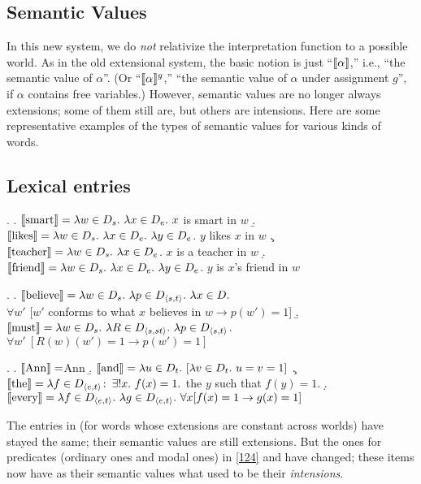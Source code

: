 \subsection{Semantic Values}

In this new system, we do \emph{not} relativize the interpretation function to a possible world. As in the old extensional system, the basic notion is just ``$\llbracket \alpha \rrbracket$,'' i.e., ``the semantic value of $\alpha$''. (Or ``$\llbracket \alpha \rrbracket^g$,'' ``the semantic value of $\alpha$ under assignment $g$'', if $\alpha$ contains free variables.) However, semantic values are no longer always extensions; some of them still are, but others are intensions. Here are some representative examples of the types of semantic values for various kinds of words.

\subsection{Lexical entries}

\ex.\label{124} \a. $\llbracket \mbox{smart} \rrbracket = \lambda w\in D_{s}.\ \lambda x\in D_{e}.\ x$ is smart in $w$ 
\b. $\sv{\mbox{likes}} = \lambda w\in D_{s}.\ \lambda x\in D_{e}.\ \lambda y\in D_{e}$. $y$ likes $x$ in $w$ 
\c. $\sv{\mbox{teacher}} = \lambda w\in D_{s}.\ \lambda x\in D_{e}$. $x$ is a teacher in $w$ 
\d. $\sv{\mbox{friend}} = \lambda w\in D_{s}.\ \lambda x\in D_{e}.\ \lambda y\in D_{e}$. $y$ is $x$'s friend in $w$

\ex. \a. $\llbracket \mbox{believe} \rrbracket = \lambda w\in D_{s}.\ \lambda p\in D_{\langle s,t \rangle}.\ \lambda x\in D.$ \\
\null\hfill$\forall w'$ [$w'$ conforms to what $x$ believes in $w \rightarrow p(w') = 1$] 
\b. $\sv{\mbox{must}} = \lambda w\in D_{s}.\ \lambda R\in D_{\angles{s,st}}.\ \lambda p\in D_{\angles{s,t}}$.\\
\null\hfill$\forall w'\ [R(w)(w') = 1 \rightarrow p(w') = 1]$

\ex. \a. $\llbracket \mbox{Ann} \rrbracket = $Ann 
\b. $\llbracket \mbox{and} \rrbracket = \lambda u\in D_{t}.\ [ \lambda v\in D_{t}.\ u=v=1]$ 
\c. $\llbracket \mbox{the} \rrbracket = \lambda f\in D_{\langle e,t \rangle}\colon\thinspace \exists !x.\ f(x) = 1.$ the $y$ such that $f(y) = 1$. 
\d. $\llbracket \mbox{every} \rrbracket = \lambda f\in D_{\langle e,t \rangle}.\ \lambda g\in D_{\langle e,t \rangle}.\ \forall x [ f(x) = 1 \rightarrow g(x) = 1]$

The entries in \Last (for words whose extensions are constant across worlds) have stayed the same; their semantic values are still extensions. But the ones for predicates (ordinary ones and modal ones) in \ref{124} and \LLast have changed; these items now have as their semantic values what used to be their \emph{intensions}.

